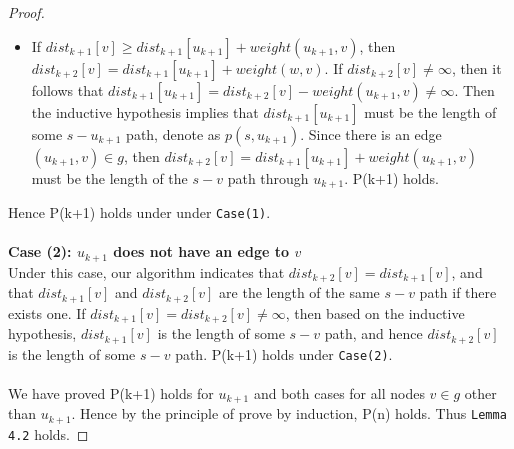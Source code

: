 \begin{proof}
\begin{itemize}
  \item If $dist_{k+1}[v] \geq dist_{k+1}[u_{k+1}] + weight(u_{k+1}, v)$, then $dist_{k+2}[v] = dist_{k+1}[u_{k+1}] + weight(w, v)$. If $dist_{k+2}[v] \neq \infty$, then it follows that $dist_{k+1}[u_{k+1}] = dist_{k+2}[v] - weight(u_{k+1}, v) \neq \infty$. Then the inductive hypothesis implies that $dist_{k+1}[u_{k+1}]$ must be the length of some $s-u_{k+1}$ path, denote as $p(s, u_{k+1})$. Since there is an edge $(u_{k+1}, v) \in g$, then $dist_{k+2}[v] = dist_{k+1}[u_{k+1}] + weight(u_{k+1}, v)$ must be the length of the $s-v$ path through $u_{k+1}$. P(k+1) holds. 
\end{itemize}
Hence P(k+1) holds under under \texttt{Case(1)}. 
\\\\
\textbf{Case (2): $u_{k+1}$ does not have an edge to $v$}
\tab\\
Under this case, our algorithm indicates that $dist_{k+2}[v] = dist_{k+1}[v]$, and that $dist_{k+1}[v]$ and $dist_{k+2}[v]$ are the length of the same $s-v$ path if there exists one. If $dist_{k+1}[v] = dist_{k+2}[v] \neq \infty$, then based on the inductive hypothesis, $dist_{k+1}[v]$ is the length of some $s-v$ path, and hence $dist_{k+2}[v]$ is the length of some $s-v$ path. P(k+1) holds under \texttt{Case(2)}. 
\\\\
We have proved P(k+1) holds for $u_{k+1}$ and both cases for all nodes $v \in g$ other than $u_{k+1}$. Hence by the principle of prove by induction, P(n) holds. Thus \texttt{\texttt{Lemma 4.2}} holds. 
\end{proof}
\tab\\ 